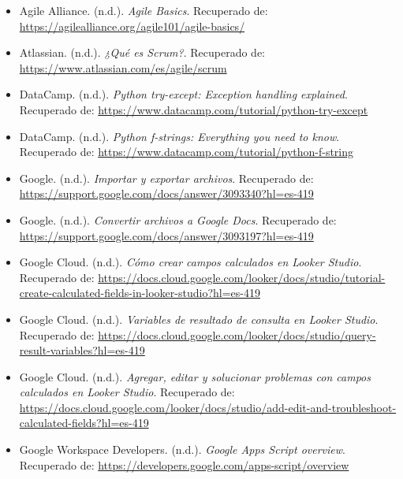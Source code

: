 \documentclass[12pt]{article}
\begin{document}
\begin{itemize}
    
    \item Agile Alliance. (n.d.). \textit{Agile Basics}.  
    Recuperado de: \url{https://agilealliance.org/agile101/agile-basics/}

    \item Atlassian. (n.d.). \textit{¿Qué es Scrum?}.  
    Recuperado de: \url{https://www.atlassian.com/es/agile/scrum}
    
    \item DataCamp. (n.d.). \textit{Python try-except: Exception handling explained}.  
    Recuperado de: \url{https://www.datacamp.com/tutorial/python-try-except}

    \item DataCamp. (n.d.). \textit{Python f-strings: Everything you need to know}.  
    Recuperado de: \url{https://www.datacamp.com/tutorial/python-f-string}

    \item Google. (n.d.). \textit{Importar y exportar archivos}.  
    Recuperado de: \url{https://support.google.com/docs/answer/3093340?hl=es-419}

    \item Google. (n.d.). \textit{Convertir archivos a Google Docs}.  
    Recuperado de: \url{https://support.google.com/docs/answer/3093197?hl=es-419}

    \item Google Cloud. (n.d.). \textit{Cómo crear campos calculados en Looker Studio}.  
    Recuperado de: \url{https://docs.cloud.google.com/looker/docs/studio/tutorial-create-calculated-fields-in-looker-studio?hl=es-419}

    \item Google Cloud. (n.d.). \textit{Variables de resultado de consulta en Looker Studio}.  
    Recuperado de: \url{https://docs.cloud.google.com/looker/docs/studio/query-result-variables?hl=es-419}

    \item Google Cloud. (n.d.). \textit{Agregar, editar y solucionar problemas con campos calculados en Looker Studio}.  
    Recuperado de: \url{https://docs.cloud.google.com/looker/docs/studio/add-edit-and-troubleshoot-calculated-fields?hl=es-419}

    \item Google Workspace Developers. (n.d.). \textit{Google Apps Script overview}.  
    Recuperado de: \url{https://developers.google.com/apps-script/overview}


\end{itemize}
\end{document}
